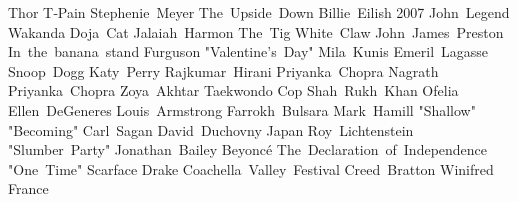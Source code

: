 \answerkey
{} Thor
 T‑Pain
 Stephenie Meyer
 The Upside Down
 Billie Eilish
 2007
 John Legend
 Wakanda
 Doja Cat
 Jalaiah Harmon
 The Tig
 White Claw
 John James Preston
 In the banana stand
 Furguson
 "Valentine's Day"
 Mila Kunis
 Emeril Lagasse
 Snoop Dogg
 Katy Perry
 Rajkumar Hirani
 Priyanka Chopra
 Nagrath
 Priyanka Chopra
 Zoya Akhtar
 Taekwondo
 Cop
 Shah Rukh Khan
 Ofelia
 Ellen DeGeneres
 Louis Armstrong
 Farrokh Bulsara
 Mark Hamill
 "Shallow"
 "Becoming"
 Carl Sagan
 David Duchovny
 Japan
 Roy Lichtenstein
 "Slumber Party"
 Jonathan Bailey
 Beyoncé
 The Declaration of Independence
 "One Time"
 Scarface
 Drake
 Coachella Valley Festival
 Creed Bratton
 Winifred
 France
\endanswerkey